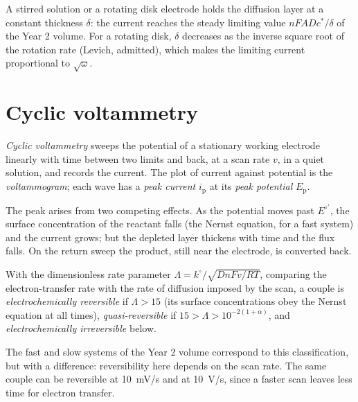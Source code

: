 A stirred solution or a rotating disk electrode holds the diffusion layer at a
constant thickness $\delta$: the current reaches the steady limiting value $nFADc^*/\delta$
of the Year 2 volume. For a rotating disk, $\delta$ decreases as the inverse square
root of the rotation rate (Levich, admitted), which makes the limiting current
proportional to $\sqrt\omega$.

\section{Cyclic voltammetry}

\begin{definition}\label{def:b3:electrode-kinetics:cv}
\emph{Cyclic voltammetry} sweeps the potential of a
stationary working electrode linearly with time between two limits and back, at
a scan rate $v$, in a quiet solution, and records the current. The plot of current
against potential is the \emph{voltammogram}; each wave has a
\emph{peak current} $i_{\mathrm p}$ at its \emph{peak potential}
$E_{\mathrm p}$.
\end{definition}

The peak arises from two competing effects. As the potential moves past $E^{\circ\prime}$, the
surface concentration of the reactant falls (the Nernst equation, for a fast
system) and the current grows; but the depleted layer thickens with time and
the flux falls. On the return sweep the product, still near the electrode, is
converted back.

\begin{definition}[Reversibility]\label{def:b3:electrode-kinetics:reversibility}
With the dimensionless rate parameter $\Lambda = k^\circ/\sqrt{DnFv/RT}$, comparing the
electron-transfer rate with the rate of diffusion imposed by the scan, a
couple is \emph{electrochemically reversible}
if $\Lambda > 15$ (its surface concentrations obey the Nernst equation
at all times), \emph{quasi-reversible} if $15 >
\Lambda > 10^{-2(1 + \alpha)}$, and \emph{electrochemically irreversible}
below.
\end{definition}

\begin{remark}
The fast and slow systems of the Year 2 volume correspond to this
classification, but with a difference: reversibility here depends on the scan
rate. The same couple can be reversible at \qty{10}{mV/s} and  at
\qty{10}{V/s}, since a faster scan leaves less time for electron transfer.
\end{remark}

